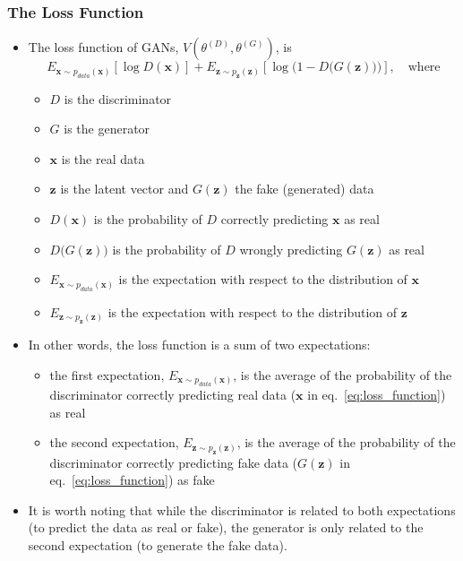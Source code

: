 \documentclass{beamer}
\begin{document}
\begin{frame}
\setlength{\leftmargini}{0.3cm}
\setlength{\leftmarginii}{0.6cm}
\setlength{\leftmarginiii}{0.9cm}
\frametitle{The Loss Function}
\begin{itemize}
\footnotesize
\item The loss function of GANs, $V(\theta^{(D)}, \theta^{(G)})$, is
\begin{equation}\label{eq:loss_function}
E_{\mathbf{x}\sim p_{data}(\mathbf{x})}\left[\log D(\mathbf{x}) \right] + E_{\mathbf{z}\sim p_{\mathbf{z}}(\mathbf{z})}\left[\log \Big(1 - D \big(G(\mathbf{z}) \big) \Big) \right], \quad \textrm{where}
\end{equation}
\vspace{-0.5cm}
	\begin{itemize}
	\footnotesize
	\item $D$ is the discriminator
	\item $G$ is the generator
	\item $\mathbf{x}$ is the real data
	\item $\mathbf{z}$ is the latent vector and $G(\mathbf{z})$ the fake (generated) data
	\item $D(\mathbf{x})$ is the probability of $D$ correctly predicting $\mathbf{x}$ as real
	\item $D\big(G(\mathbf{z}) \big)$ is the probability of $D$ wrongly predicting $G(\mathbf{z})$ as real
	\item $E_{\mathbf{x}\sim p_{data}(\mathbf{x})}$ is the expectation with respect to the distribution of $\mathbf{x}$
	\item $E_{\mathbf{z}\sim p_{\mathbf{z}}(\mathbf{z})}$ is the expectation with respect to the distribution of $\mathbf{z}$
	\end{itemize}
\item In other words, the loss function is a sum of two expectations:
	\begin{itemize}
	\footnotesize
	\item the first expectation, $E_{\mathbf{x}\sim p_{data}(\mathbf{x})}$, is the average of the probability of the discriminator correctly predicting real data ($\mathbf{x}$ in eq.~\eqref{eq:loss_function}) as real
	\item the second expectation, $E_{\mathbf{z}\sim p_{\mathbf{z}}(\mathbf{z})}$, is the average of the probability of the discriminator correctly predicting fake data ($G(\mathbf{z})$ in eq.~\eqref{eq:loss_function}) as fake
	\end{itemize}
\item It is worth noting that while the discriminator is related to both expectations (to predict the data as real or fake), the generator is only related to the second expectation (to generate the fake data).
\end{itemize}
\end{frame}
\end{document}
